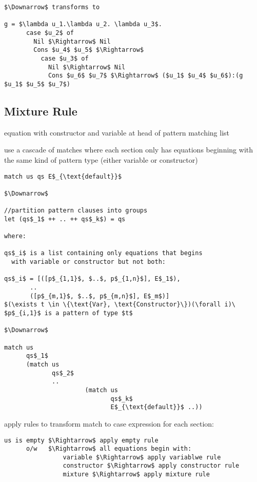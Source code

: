 \documentclass[8pt]{extarticle}
\begin{document}
\begin{multicols*}{2}
\begin{lstlisting}
$\Downarrow$ transforms to

g = $\lambda u_1.\lambda u_2. \lambda u_3$.
      case $u_2$ of
        Nil $\Rightarrow$ Nil
        Cons $u_4$ $u_5$ $\Rightarrow$
          case $u_3$ of
            Nil $\Rightarrow$ Nil
            Cons $u_6$ $u_7$ $\Rightarrow$ ($u_1$ $u_4$ $u_6$):(g $u_1$ $u_5$ $u_7$)
\end{lstlisting}

\vfill\null
\columnbreak

\subsection{Mixture Rule}

equation with constructor and variable at head of pattern matching list

use a cascade of matches where each section only has equations beginning with the same kind of pattern type (either variable or constructor)

\begin{lstlisting}
match us qs E$_{\text{default}}$

$\Downarrow$

//partition pattern clauses into groups
let (qs$_1$ ++ .. ++ qs$_k$) = qs

where:

qs$_i$ is a list containing only equations that begins
  with variable or constructor but not both:

qs$_i$ = [([p$_{1,1}$, $..$, p$_{1,n}$], E$_1$),
       ..
       ([p$_{m,1}$, $..$, p$_{m,n}$], E$_m$)]
$(\exists t \in \{\text{Var}, \text{Constructor}\})(\forall i)\ $p$_{i,1}$ is a pattern of type $t$

$\Downarrow$

match us
      qs$_1$
      (match us
             qs$_2$
             ..
                      (match us
                             qs$_k$
                             E$_{\text{default}}$ ..))
\end{lstlisting}

apply rules to transform match to case expression for each section:

\begin{lstlisting}
us is empty $\Rightarrow$ apply empty rule
      o/w   $\Rightarrow$ all equations begin with:
                variable $\Rightarrow$ apply variablwe rule
                constructor $\Rightarrow$ apply constructor rule
                mixture $\Rightarrow$ apply mixture rule
\end{lstlisting}


\end{multicols*}
\end{document}
